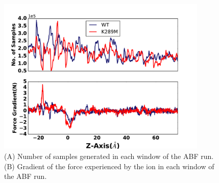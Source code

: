 \documentclass[9pt,onecolumn,oneside,lineno]{pnas-new}
\begin{document}
\begin{figure}
\begin{center}
\includegraphics[width = 100mm]{figures_2/Sup_ABF_plots_comp.pdf}
\end{center}
\caption{(A) Number of samples generated in each window of the ABF run. (B) Gradient of the force experienced by the ion in each window of the ABF run. }
\label{fig:ABF_2}
\end{figure}

\clearpage


\end{document}
